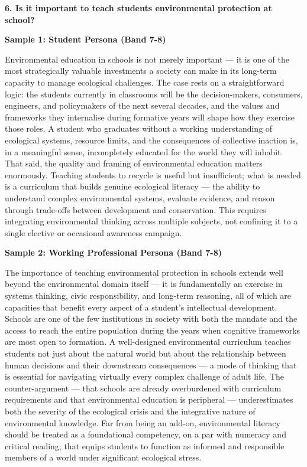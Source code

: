 \separator

\begin{ieltsquestion}
\textbf{6. Is it important to teach students environmental protection at school?}
\end{ieltsquestion}
\textbf{Sample 1: Student Persona (Band 7-8)}

Environmental education in schools is not merely important — it is one of the most strategically valuable investments a society can make in its long-term capacity to manage ecological challenges. The case rests on a straightforward logic: the students currently in classrooms will be the decision-makers, consumers, engineers, and policymakers of the next several decades, and the values and frameworks they internalise during formative years will shape how they exercise those roles. A student who graduates without a working understanding of ecological systems, resource limits, and the consequences of collective inaction is, in a meaningful sense, incompletely educated for the world they will inhabit. That said, the quality and framing of environmental education matters enormously. Teaching students to recycle is useful but insufficient; what is needed is a curriculum that builds genuine ecological literacy — the ability to understand complex environmental systems, evaluate evidence, and reason through trade-offs between development and conservation. This requires integrating environmental thinking across multiple subjects, not confining it to a single elective or occasional awareness campaign.

\textbf{Sample 2: Working Professional Persona (Band 7-8)}

The importance of teaching environmental protection in schools extends well beyond the environmental domain itself — it is fundamentally an exercise in systems thinking, civic responsibility, and long-term reasoning, all of which are capacities that benefit every aspect of a student's intellectual development. Schools are one of the few institutions in society with both the mandate and the access to reach the entire population during the years when cognitive frameworks are most open to formation. A well-designed environmental curriculum teaches students not just about the natural world but about the relationship between human decisions and their downstream consequences — a mode of thinking that is essential for navigating virtually every complex challenge of adult life. The counter-argument — that schools are already overburdened with curriculum requirements and that environmental education is peripheral — underestimates both the severity of the ecological crisis and the integrative nature of environmental knowledge. Far from being an add-on, environmental literacy should be treated as a foundational competency, on a par with numeracy and critical reading, that equips students to function as informed and responsible members of a world under significant ecological stress.

